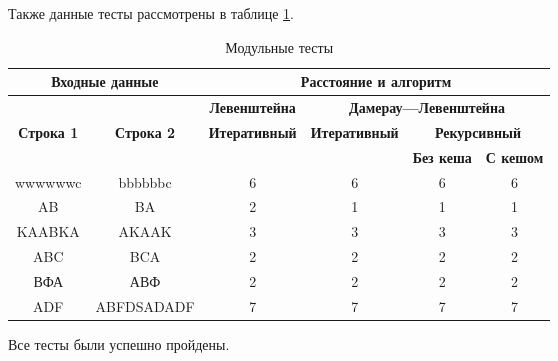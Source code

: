 Также данные тесты рассмотрены в таблице \ref{t:unit_tests}.

\begin{table}[!ht]
	
	\begin{center}
		\small
		\begin{threeparttable}
		\caption{Модульные тесты}
        \label{t:unit_tests}
		\begin{tabular}{|c|c|c|c|c|c|}
			\hline
			\multicolumn{2}{|c|}{\bfseries Входные данные}
			& \multicolumn{4}{c|}{\bfseries Расстояние и алгоритм} \\ 
			\hline 
			&
			& \multicolumn{1}{c|}{\bfseries Левенштейна} 
			& \multicolumn{3}{c|}{\bfseries Дамерау---Левенштейна} \\ \cline{3-6}
			
			\bfseries Строка 1 & \bfseries Строка 2 & \bfseries Итеративный & \bfseries Итеративный
			
			& \multicolumn{2}{c|}{\bfseries Рекурсивный} \\ \cline{5-6}
			& & & & \bfseries Без кеша & \bfseries С кешом \\
			\hline
			wwwwwwc & bbbbbbc & 6 & 6 & 6 & 6 \\
			\hline
			AB & BA & 2 & 1 & 1 & 1 \\
			\hline
			KAABKA & AKAAK & 3 & 3 & 3 & 3 \\
			\hline
			ABC & BCA & 2 & 2 & 2 & 2 \\
			\hline
			ВФА & АВФ & 2 & 2 & 2 & 2 \\
			\hline
			ADF & ABFDSADADF & 7 & 7 & 7 & 7 \\
			\hline
		\end{tabular}	
		\end{threeparttable}
	\end{center}
\end{table}

Все тесты были успешно пройдены.